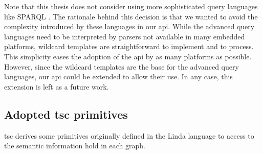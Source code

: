 


Note that this thesis does not consider using more sophisticated query languages like SPARQL . %
The rationale behind this decision is that we wanted to avoid the complexity introduced by these languages in our \ac{api}.
While the advanced query languages need to be interpreted by parsers not available in many embedded platforms,
wildcard templates are straightforward to implement and to process.
This simplicity eases the adoption of the \ac{api} by as many platforms as possible.
However, since the wildcard templates are the base for the advanced query languages, our \ac{api} could be extended to allow their use.
In any case, this extension is left as a future work.



\subsection{Adopted \acs{tsc} primitives}
\label{sec:primitives}

\acs{tsc} derives some primitives originally defined in the Linda language \citep{gelernter_generative_1985} to access to the semantic information hold in each graph.

